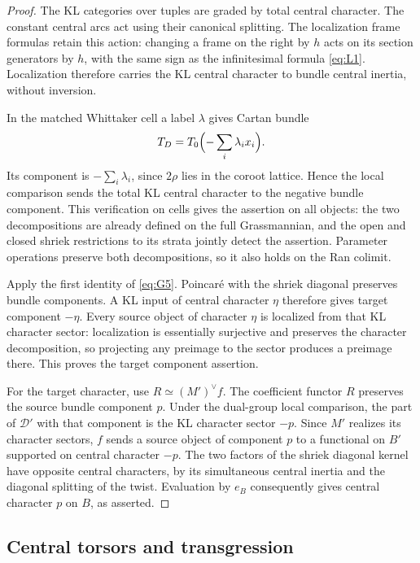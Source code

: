 \documentclass[11pt]{article}
\numberwithin{equation}{section}
\theoremstyle{definition}
\theoremstyle{remark}
\begin{document}
\begin{proof}
The KL categories over tuples are graded by total central character.
The constant central arcs act using their canonical splitting.  The
localization frame formulas retain this action: changing a frame on
the right by \(h\) acts on its section generators by \(h\), with the
same sign as the infinitesimal formula \eqref{eq:L1}.  Localization
therefore carries the KL central character to bundle central inertia,
without inversion.

In the matched Whittaker cell a label \(\lambda\) gives Cartan bundle
\[
 T_D=T_0\Bigl(-\sum_i\lambda_i x_i\Bigr).
\]
Its component is \(-\sum_i\lambda_i\), since \(2\rho\) lies in the
coroot lattice.  Hence the local comparison sends the total KL central
character to the negative bundle component.  This verification on
cells gives the assertion on all objects: the two decompositions are
already defined on the full Grassmannian, and the open and closed
shriek restrictions to its strata jointly detect the assertion.
Parameter operations preserve both decompositions, so it also holds
on the Ran colimit.

Apply the first identity of \eqref{eq:G5}.  Poincar\'e with the shriek
diagonal preserves bundle components.  A KL input of central character
\(\eta\) therefore gives target component \(-\eta\).  Every source
object of character \(\eta\) is localized from that KL character
sector: localization is essentially surjective and preserves the
character decomposition, so projecting any preimage to the sector
produces a preimage there.  This proves the target component assertion.

For the target character, use \(R\simeq(M')^\vee f\).  The
coefficient functor \(R\) preserves the source bundle component
\(p\).  Under the dual-group local comparison, the part of
\(\mathcal D'\) with that component is the KL character sector
\(-p\).  Since \(M'\) realizes its character sectors, \(f\) sends
a source object of component \(p\) to a functional on \(B'\)
supported on central character \(-p\).  The two factors of the
shriek diagonal kernel have opposite central characters, by its
simultaneous central inertia and the diagonal splitting of the twist.
Evaluation by \(e_B\) consequently gives central character \(p\)
on \(B\), as asserted.
\end{proof}

\subsection{Central torsors and transgression}
\end{document}
